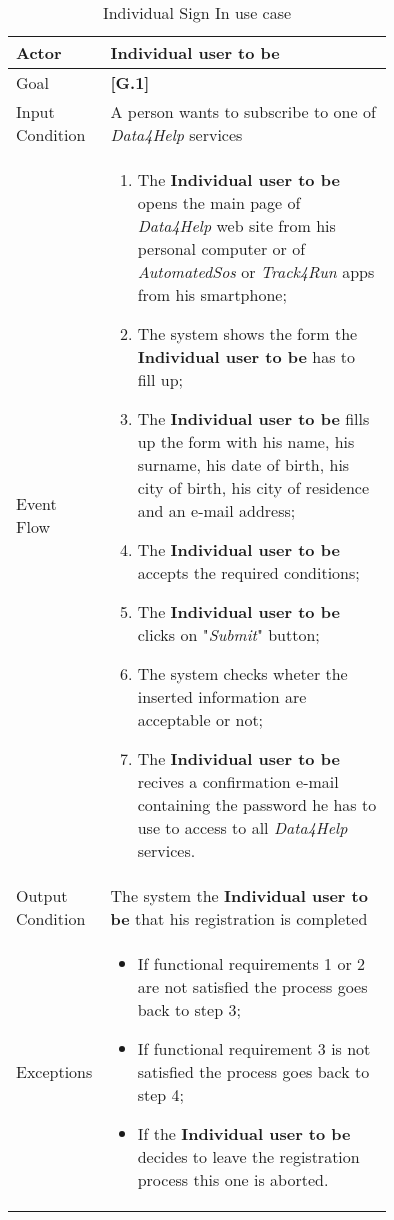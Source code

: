 \begin{center}
\begin{table}
\begin{tabular}{ | l | p{0.75\linewidth} | }
  \hline
    Actor & \textbf{Individual user to be} \\ \hline
    Goal & \textbf{[G.1]} \\ \hline
    Input Condition & A person wants to subscribe to one of \textit{Data4Help} services \\ \hline
    Event Flow & \begin{minipage}[t]{0.7\textwidth}
      \begin{enumerate}
        \item The \textbf{Individual user to be} opens the main page of \textit{Data4Help} web site from his personal computer or of \textit{AutomatedSos} or \textit{Track4Run} apps from his smartphone;
        \item The system shows the form the \textbf{Individual user to be} has to fill up;
        \item The \textbf{Individual user to be} fills up the form with his name, his surname, his date of birth, his city of birth, his city of residence and an e-mail address;
        \item The \textbf{Individual user to be} accepts the required conditions;
        \item The \textbf{Individual user to be} clicks on "\textit{Submit}" button;
        \item The system checks wheter the inserted information are acceptable or not;
        \item The \textbf{Individual user to be} recives a confirmation e-mail containing the password he has to use to access to all \textit{Data4Help} services.
      \end{enumerate}
    \smallskip
  \end{minipage} \\ \hline
  Output Condition & The system the \textbf{Individual user to be} that his registration is completed \\ \hline
  Exceptions & \begin{minipage}[t]{0.7\textwidth}
    \begin{itemize}
      \smallskip
      \item If functional requirements 1 or 2 are not satisfied the process goes back to step 3;
      \item If functional requirement 3 is not satisfied the process goes back to step 4;
      \item If the \textbf{Individual user to be} decides to leave the registration process this one is aborted.
    \end{itemize}
    \smallskip
  \end{minipage}  \\ \hline
\end{tabular}
\caption{Individual Sign In use case}
\label{table:individualSignInTable}
\end{table}
\end{center}
